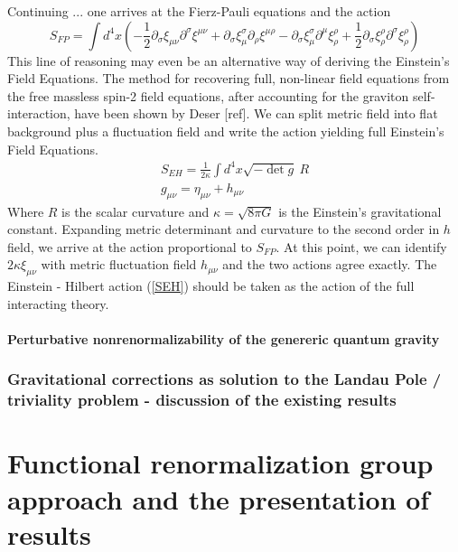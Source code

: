 \documentclass[11pt, a4paper]{article}
\begin{document}
Continuing ... one arrives at the Fierz-Pauli equations and the action
\begin{equation}
    S_{FP} = \int d^4 x \left( -\frac{1}{2} \partial_\sigma \xi_{\mu\nu} \partial^\sigma \xi^{\mu\nu} +  \partial_\sigma \xi_\mu^\sigma \partial_\rho \xi^{\mu\rho} - \partial_\sigma \xi_\mu^\sigma \partial^\mu \xi_\rho^\rho +\frac{1}{2} \partial_\sigma \xi_\rho^\rho \partial^\sigma \xi_\rho^\rho \right)
    \label{SFP}
\end{equation}
This line of reasoning may even be an alternative way of deriving the Einstein's Field Equations. The method for recovering full, non-linear
field equations from the free massless spin-2 field equations, after accounting for the graviton self-interaction, have been shown by Deser [ref]. 
We can split metric field into flat background plus a fluctuation field and write the action yielding full Einstein's Field Equations.
\begin{gather}
    S_{EH} = \frac{1}{2 \kappa} \int d^4 x \sqrt{-\det{g}} \ R 
    \label{SEH} \\
    g_{\mu\nu} = \eta_{\mu\nu} + h_{\mu\nu}
\end{gather}
Where $R$ is the scalar curvature and $\kappa = \sqrt{8 \pi G}$ is the Einstein's gravitational constant. Expanding metric determinant and curvature to the second order in $h$ field, we arrive at the action proportional to $S_{FP}$.
At this point, we can identify $2\kappa\xi_{\mu\nu}$ with metric fluctuation field $h_{\mu\nu}$ and the two actions agree exactly.
The Einstein - Hilbert action (\ref{SEH}) should be taken as the action of the full interacting theory.

\subsection*{\centering Perturbative nonrenormalizability of the genereric quantum gravity}

\section{Gravitational corrections as solution to the Landau Pole / triviality problem - discussion of the existing results}

\part{Functional renormalization group approach and the presentation of results}
\end{document}
